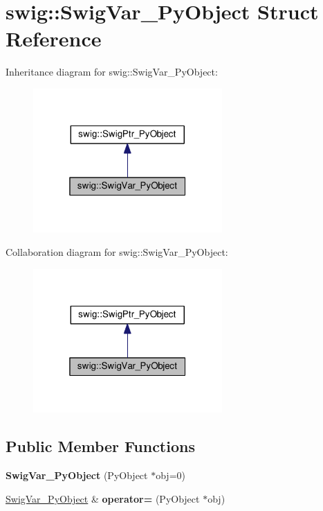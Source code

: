 \hypertarget{structswig_1_1SwigVar__PyObject}{}\section{swig\+:\+:Swig\+Var\+\_\+\+Py\+Object Struct Reference}
\label{structswig_1_1SwigVar__PyObject}


Inheritance diagram for swig\+:\+:Swig\+Var\+\_\+\+Py\+Object\+:\nopagebreak
\begin{figure}[H]
\begin{center}
\leavevmode
\includegraphics[width=205pt]{structswig_1_1SwigVar__PyObject__inherit__graph}
\end{center}
\end{figure}


Collaboration diagram for swig\+:\+:Swig\+Var\+\_\+\+Py\+Object\+:\nopagebreak
\begin{figure}[H]
\begin{center}
\leavevmode
\includegraphics[width=205pt]{structswig_1_1SwigVar__PyObject__coll__graph}
\end{center}
\end{figure}
\subsection*{Public Member Functions}
\begin{DoxyCompactItemize}
\item 
{\bfseries Swig\+Var\+\_\+\+Py\+Object} (Py\+Object $\ast$obj=0)\hypertarget{structswig_1_1SwigVar__PyObject_a2b61f843215bceaff8ec2ea6e92d46c2}{}\label{structswig_1_1SwigVar__PyObject_a2b61f843215bceaff8ec2ea6e92d46c2}

\item 
\hyperlink{structswig_1_1SwigVar__PyObject}{Swig\+Var\+\_\+\+Py\+Object} \& {\bfseries operator=} (Py\+Object $\ast$obj)\hypertarget{structswig_1_1SwigVar__PyObject_a7e6053b64cf6e787b99a67b09cdc6d89}{}\label{structswig_1_1SwigVar__PyObject_a7e6053b64cf6e787b99a67b09cdc6d89}

\end{DoxyCompactItemize}

